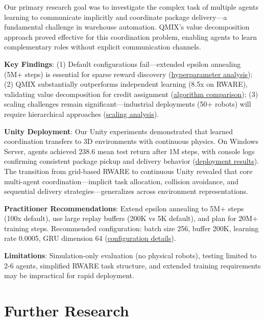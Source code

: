 \documentclass[11pt]{article}
\begin{document}
Our primary research goal was to investigate the complex task of multiple agents learning to communicate implicitly and coordinate package delivery---a fundamental challenge in warehouse automation. QMIX's value decomposition approach proved effective for this coordination problem, enabling agents to learn complementary roles without explicit communication channels.

\textbf{Key Findings}: (1) Default configurations fail---extended epsilon annealing (5M+ steps) is essential for sparse reward discovery (\href{https://pallman14.github.io/MARL-QMIX-Warehouse-Robots/dre/week2.html}{hyperparameter analysis}); (2) QMIX substantially outperforms independent learning (8.5x on RWARE), validating value decomposition for credit assignment (\href{https://pallman14.github.io/MARL-QMIX-Warehouse-Robots/lian/week4.html}{algorithm comparison}); (3) scaling challenges remain significant---industrial deployments (50+ robots) will require hierarchical approaches (\href{https://pallman14.github.io/MARL-QMIX-Warehouse-Robots/salmon/week3.html}{scaling analysis}).

\textbf{Unity Deployment}: Our Unity experiments demonstrated that learned coordination transfers to 3D environments with continuous physics. On Windows Server, agents achieved 238.6 mean test return after 1M steps, with console logs confirming consistent package pickup and delivery behavior (\href{https://pallman14.github.io/MARL-QMIX-Warehouse-Robots/salmon/week5.html}{deployment results}). The transition from grid-based RWARE to continuous Unity revealed that core multi-agent coordination---implicit task allocation, collision avoidance, and sequential delivery strategies---generalizes across environment representations.

\textbf{Practitioner Recommendations}: Extend epsilon annealing to 5M+ steps (100x default), use large replay buffers (200K vs 5K default), and plan for 20M+ training steps. Recommended configuration: batch size 256, buffer 200K, learning rate 0.0005, GRU dimension 64 (\href{https://pallman14.github.io/MARL-QMIX-Warehouse-Robots/dre/week2.html}{configuration details}).

\textbf{Limitations}: Simulation-only evaluation (no physical robots), testing limited to 2-6 agents, simplified RWARE task structure, and extended training requirements may be impractical for rapid deployment.

\section{Further Research}
\end{document}
